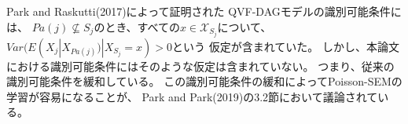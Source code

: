 Park and Raskutti(2017)\cite{Park2017-hw}によって証明された
QVF-DAGモデルの識別可能条件には、
$Pa(j) \nsubseteq S_j$のとき、すべての$x \in \mathcal X_{S_j}$について、
$\mathit{Var}(E(X_j | X_{Pa(j)}) | X_{S_j} = x) > 0$という
仮定が含まれていた。
しかし、本論文における識別可能条件にはそのような仮定は含まれていない。
つまり、従来の識別可能条件\cite{Park2017-hw}を緩和している。
この識別可能条件の緩和によってPoisson-SEMの学習が容易になることが、
Park and Park(2019)\cite{Park2019-qy}の3.2節において議論されている。
